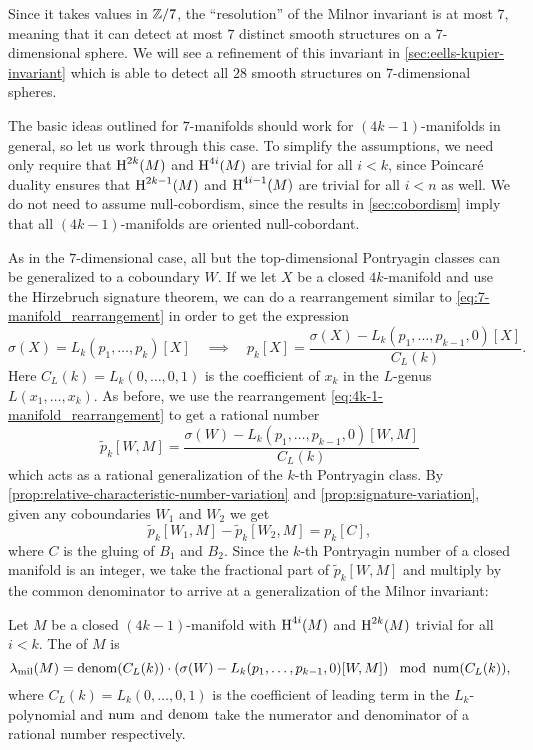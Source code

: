 \begin{remark*}
	Since it takes values in $\mathbb{Z}/7$, the ``resolution'' of the Milnor invariant is at most $7$, meaning that it can detect at most $7$ distinct smooth structures on a $7$-dimensional sphere. We will see a refinement of this invariant in \cref{sec:eells-kupier-invariant} which is able to detect all $28$ smooth structures on $7$-dimensional spheres.
\end{remark*}

The basic ideas outlined for $7$-manifolds should work for $(4k-1)$-manifolds in general, so let us work through this case. To simplify the assumptions, we need only require that $\operatorname{H}^{2k}(M)$ and $\operatorname{H}^{4i}(M)$ are trivial for all $i<k$, since Poincar\'e duality ensures that $\operatorname{H}^{2k-1}(M)$ and $\operatorname{H}^{4i-1}(M)$ are trivial for all $i<n$ as well. We do not need to assume null-cobordism, since the results in \cref{sec:cobordism} imply that all $(4k-1)$-manifolds are oriented null-cobordant.

As in the $7$-dimensional case, all but the top-dimensional Pontryagin classes can be generalized to a coboundary $W$.
If we let $X$ be a closed $4k$-manifold and use the Hirzebruch signature theorem, we can do a rearrangement similar to \cref{eq:7-manifold_rearrangement} in order to get the expression
\begin{equation}\label{eq:4k-1-manifold_rearrangement}
	\sigma(X) = L_k(p_1, \ldots, p_k)[X]\quad\implies\quad
	p_k[X] = \frac{\sigma(X) - L_k(p_1,\ldots, p_{k-1}, 0)[X]}{C_L(k)}.
\end{equation}
Here $C_L(k)=L_k(0,\ldots, 0, 1)$ is the coefficient of $x_k$ in the $L$-genus $L(x_1,\ldots, x_k)$.
As before, we use the rearrangement \cref{eq:4k-1-manifold_rearrangement} to get a rational number
\[
	\widetilde{p}_k[W, M] = \frac{\sigma(W) - L_k(p_1,\ldots, p_{k-1}, 0)[W,M]}{C_L(k)}
\]
which acts as a rational generalization of the $k$-th Pontryagin class. By \cref{prop:relative-characteristic-number-variation} and \cref{prop:signature-variation}, given any coboundaries $W_1$ and $W_2$ we get
\[
	\widetilde{p}_k[W_1, M] - \widetilde{p}_k[W_2, M] = p_k[C],
\]
where $C$ is the gluing of $B_1$ and $B_2$. Since the $k$-th Pontryagin number of a closed manifold is an integer, we take the fractional part of $\widetilde{p}_k[W,M]$ and multiply by the common denominator to arrive at a generalization of the Milnor invariant:

\begin{definition}
	Let $M$ be a closed $(4k-1)$-manifold with $\operatorname{H}^{4i}(M)$ and $\operatorname{H}^{2k}(M)$ trivial for all $i<k$. The  of $M$ is
	\[
		\lambda_{\mathrm{mil}}(M) = \operatorname{denom}(C_L(k))\cdot \left(\sigma(W) - L_k(p_1, \ldots, p_{k-1},0)[W,M]\right)\mod {\operatorname{num}}(C_L(k)),
	\]
	where $C_L(k) = L_k(0,\ldots,0,1)$ is the coefficient of leading term in the $L_k$-polynomial and $\operatorname{num}$ and $\operatorname{denom}$ take the numerator and denominator of a rational number respectively.
\end{definition}

